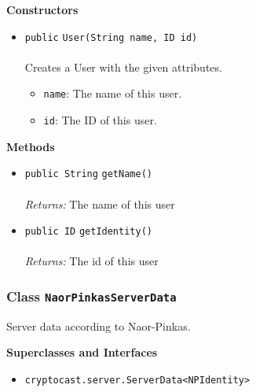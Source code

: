 \textbf{\sffamily Constructors}
\begin{itemize}
\item \lstinline|public| \lstinline|User|\lstinline|(String name, ID id)|\\ \\[-0.6em]
Creates a User with the given attributes.
\begin{itemize}
\item \lstinline|name|: The name of this user.
\item \lstinline|id|: The ID of this user.
\end{itemize}



\end{itemize}


\textbf{\sffamily Methods}
\begin{itemize}
\item \lstinline|public String| \lstinline|getName|\lstinline|()|\\ \\[-0.6em]
\emph{Returns:} The name of this user



\item \lstinline|public ID| \lstinline|getIdentity|\lstinline|()|\\ \\[-0.6em]
\emph{Returns:} The id of this user



\end{itemize}

\subsubsection{Class \lstinline|NaorPinkasServerData|}
Server data according to Naor-Pinkas. \\
\noindent\begin{minipage}[t]{5cm}
\vspace{0.3em}
\hspace*{2em}
\vspace{0.3em}
\end{minipage}



\textbf{\sffamily Superclasses and Interfaces}
\begin{itemize}
\item \lstinline|cryptocast.server.ServerData<NPIdentity>|
\end{itemize}


